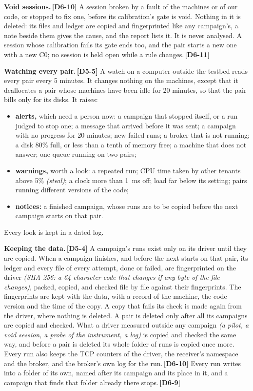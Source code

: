 \documentclass[11pt]{article}
\newcommand{\gl}[1]{{\color{soft}\itshape\small (#1)}}
\newcommand{\chgold}[1]{\,{\color{oldcol}\bfseries\footnotesize[#1]}}
\begin{document}
\textbf{Void sessions.}\chgold{D6-10} A session broken by a fault of the machines or of our code, or stopped to fix one, before its calibration's gate is void. Nothing in it is deleted: its files and ledger are copied and fingerprinted like any campaign's, a note beside them gives the cause, and the report lists it. It is never analysed. A session whose calibration fails its gate ends too, and the pair starts a new one with a new C0; no session is held open while a rule changes.\chgold{D6-11}

\textbf{Watching every pair.}\chgold{D5-5} A watch on a computer outside the testbed reads every pair every 5 minutes. It changes nothing on the machines, except that it deallocates a pair whose machines have been idle for 20 minutes, so that the pair bills only for its disks. It raises:
\begin{itemize}
  \item \textbf{alerts,} which need a person now: a campaign that stopped itself, or a run judged to stop one; a message that arrived before it was sent; a campaign with no progress for 20 minutes; new failed runs; a broker that is not running; a disk 80\% full, or less than a tenth of memory free; a machine that does not answer; one queue running on two pairs;
  \item \textbf{warnings,} worth a look: a repeated run; CPU time taken by other tenants above 5\% \gl{steal}; a clock more than 1~ms off; load far below its setting; pairs running different versions of the code;
  \item \textbf{notices:} a finished campaign, whose runs are to be copied before the next campaign starts on that pair.
\end{itemize}
Every look is kept in a dated log.

\textbf{Keeping the data.}\chgold{D5-4} A campaign's runs exist only on its driver until they are copied. When a campaign finishes, and before the next starts on that pair, its ledger and every file of every attempt, done or failed, are fingerprinted on the driver \gl{SHA-256: a 64-character code that changes if any byte of the file changes}, packed, copied, and checked file by file against their fingerprints. The fingerprints are kept with the data, with a record of the machine, the code version and the time of the copy. A copy that fails its check is made again from the driver, where nothing is deleted. A pair is deleted only after all its campaigns are copied and checked. What a driver measured outside any campaign \gl{a pilot, a void session, a probe of the instrument, a log} is copied and checked the same way, and before a pair is deleted its whole folder of runs is copied once more. Every run also keeps the TCP counters of the driver, the receiver's namespace and the broker, and the broker's own log for the run.\chgold{D6-10} Every run writes into a folder of its own, named after its campaign and its place in it, and a campaign that finds that folder already there stops.\chgold{D6-9}
\end{document}
